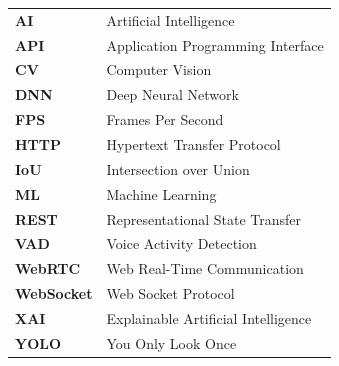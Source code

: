 \begin{tabular}{p{2.5cm}p{10cm}}
\textbf{AI} & Artificial Intelligence \\
\textbf{API} & Application Programming Interface \\
\textbf{CV} & Computer Vision \\
\textbf{DNN} & Deep Neural Network \\
\textbf{FPS} & Frames Per Second \\
\textbf{HTTP} & Hypertext Transfer Protocol \\
\textbf{IoU} & Intersection over Union \\
\textbf{ML} & Machine Learning \\
\textbf{REST} & Representational State Transfer \\
\textbf{VAD} & Voice Activity Detection \\
\textbf{WebRTC} & Web Real-Time Communication \\
\textbf{WebSocket} & Web Socket Protocol \\
\textbf{XAI} & Explainable Artificial Intelligence \\
\textbf{YOLO} & You Only Look Once \\
\end{tabular}



\newtheorem{theorem}{Theorem}[chapter]
\newtheorem{assertion}[theorem]{Assertion}
\newtheorem{claim}[theorem]{Claim}
\newtheorem{conjecture}[theorem]{Conjecture}
\newtheorem{corollary}[theorem]{Corollary}
\newtheorem{definition}[theorem]{Definition}
\newtheorem{example}[theorem]{Example}
\newtheorem{figger}[theorem]{Figure}
\newtheorem{lemma}[theorem]{Lemma}
\newtheorem{prop}[theorem]{Proposition}
\newtheorem{remark}[theorem]{Remark}

\cleardoublepage%
